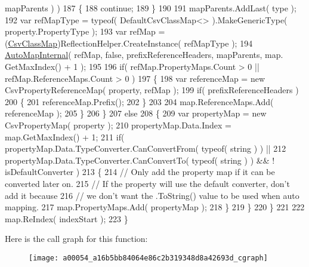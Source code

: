 \begin{DoxyCode}
      mapParents ) )
187                     \{
188                         \textcolor{keywordflow}{continue};
189                     \}
190 
191                     mapParents.AddLast( type );
192                     var refMapType = typeof( DefaultCsvClassMap<> ).MakeGenericType( property.PropertyType 
      );
193                     var refMap = (\hyperlink{a00054_affc5ae8f2b0406d496bcbdf246da6210}{CsvClassMap})ReflectionHelper.CreateInstance( refMapType );
194                     \hyperlink{a00054_a16b5bb84064e86c2b319348d8a42693d}{AutoMapInternal}( refMap, \textcolor{keyword}{false}, prefixReferenceHeaders, mapParents, map.
      GetMaxIndex() + 1 );
195 
196                     \textcolor{keywordflow}{if}( refMap.PropertyMaps.Count > 0 || refMap.ReferenceMaps.Count > 0 )
197                     \{
198                         var referenceMap = \textcolor{keyword}{new} CsvPropertyReferenceMap( property, refMap );
199                         \textcolor{keywordflow}{if}( prefixReferenceHeaders )
200                         \{
201                             referenceMap.Prefix();
202                         \}
203 
204                         map.ReferenceMaps.Add( referenceMap );
205                     \}
206                 \}
207                 \textcolor{keywordflow}{else}
208                 \{
209                     var propertyMap = \textcolor{keyword}{new} CsvPropertyMap( property );
210                     propertyMap.Data.Index = map.GetMaxIndex() + 1;
211                     \textcolor{keywordflow}{if}( propertyMap.Data.TypeConverter.CanConvertFrom( typeof( \textcolor{keywordtype}{string} ) ) ||
212                         propertyMap.Data.TypeConverter.CanConvertTo( typeof( \textcolor{keywordtype}{string} ) ) && !
      isDefaultConverter )
213                     \{
214                         \textcolor{comment}{// Only add the property map if it can be converted later on.}
215                         \textcolor{comment}{// If the property will use the default converter, don't add it because}
216                         \textcolor{comment}{// we don't want the .ToString() value to be used when auto mapping.}
217                         map.PropertyMaps.Add( propertyMap );
218                     \}
219                 \}
220             \}
221 
222             map.ReIndex( indexStart );
223         \}
\end{DoxyCode}


Here is the call graph for this function\-:
\nopagebreak
\begin{figure}[H]
\begin{center}
\leavevmode
\texttt{[image: a00054\_a16b5bb84064e86c2b319348d8a42693d\_cgraph]}
\end{center}
\end{figure}


